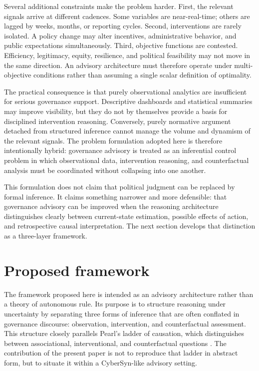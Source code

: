 \documentclass[11pt]{article}
\begin{document}
Several additional constraints make the problem harder. First, the relevant signals arrive at different cadences. Some variables are near-real-time; others are lagged by weeks, months, or reporting cycles. Second, interventions are rarely isolated. A policy change may alter incentives, administrative behavior, and public expectations simultaneously. Third, objective functions are contested. Efficiency, legitimacy, equity, resilience, and political feasibility may not move in the same direction. An advisory architecture must therefore operate under multi-objective conditions rather than assuming a single scalar definition of optimality.

The practical consequence is that purely observational analytics are insufficient for serious governance support. Descriptive dashboards and statistical summaries may improve visibility, but they do not by themselves provide a basis for disciplined intervention reasoning. Conversely, purely normative argument detached from structured inference cannot manage the volume and dynamism of the relevant signals. The problem formulation adopted here is therefore intentionally hybrid: governance advisory is treated as an inferential control problem in which observational data, intervention reasoning, and counterfactual analysis must be coordinated without collapsing into one another.

This formulation does not claim that political judgment can be replaced by formal inference. It claims something narrower and more defensible: that governance advisory can be improved when the reasoning architecture distinguishes clearly between current-state estimation, possible effects of action, and retrospective causal interpretation. The next section develops that distinction as a three-layer framework.

\section{Proposed framework}

The framework proposed here is intended as an advisory architecture rather than a theory of autonomous rule. Its purpose is to structure reasoning under uncertainty by separating three forms of inference that are often conflated in governance discourse: observation, intervention, and counterfactual assessment. This structure closely parallels Pearl's ladder of causation, which distinguishes between associational, interventional, and counterfactual questions \citep{pearl2000}. The contribution of the present paper is not to reproduce that ladder in abstract form, but to situate it within a CyberSyn-like advisory setting.
\end{document}
